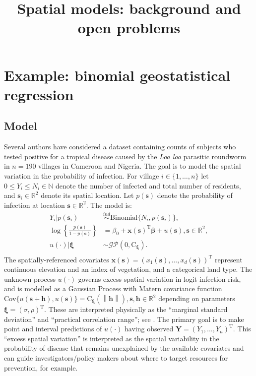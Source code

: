 \documentclass[12pt]{article}
\title{Spatial models: background and open problems}
\author{}
\date{}
\newcommand{\Nats}{\mathbb{N}}
\newcommand{\Reals}{\mathbb{R}}
\newcommand{\mb}[1]{\boldsymbol{#1}}
\newcommand{\Tr}{^{\textrm{T}}}
\newcommand{\norm}[1]{\left\lVert#1\right\rVert}
\begin{document}
\maketitle
\tableofcontents

\newpage

\section{Example: binomial geostatistical regression}

\subsection{Model}

Several authors \citep{loaloa,geostatsp,prevmap} have considered a dataset containing 
counts of subjects who tested positive for a tropical
disease caused by the \emph{Loa loa} parasitic roundworm in $n = 190$
villages in Cameroon and Nigeria. The goal is to model the spatial variation in
the probability of infection. For village $i\in\{1,\ldots,n\}$ let $0\leq Y_{i}\leq N_{i}\in\Nats$ denote the number 
of infected and total number of residents, and $\mb{s}_{i}\in\Reals^{2}$ denote its spatial location.
Let $p(\mb{s})$ denote the probability of infection at location $\mb{s}\in\Reals^{2}$. The model is:
\begin{equation}\begin{aligned}
Y_{i} | p(\mb{s}_{i}) &\overset{ind}{\sim}\text{Binomial}\{N_{i},p(\mb{s}_{i})\}, \\
\log\left\{\frac{p(\mb{s})}{1-p(\mb{s})}\right\} &= \beta_{0} + \mb{x}(\mb{s})\Tr\mb{\beta} + u(\boldsymbol{s}), \mb{s}\in\Reals^{2}, \\
u(\cdot) | \boldsymbol{\mb{\xi}} &\sim \mathcal{GP}(0,\text{C}_{\boldsymbol{\xi}}). \\
\end{aligned}\end{equation} 
The spatially-referenced covariates $\mb{x}(\mb{s}) = (x_1(\mb{s}),\ldots,x_d(\mb{s}))\Tr$ represent continuous elevation and an index of vegetation, and a categorical land type.
The unknown process \(u(\cdot)\)
governs excess spatial variation in logit infection risk, and is
modelled as a Gaussian Process with Matern
covariance function $\text{Cov}\{u(\mb{s}+\mb{h}),u(\mb{s})\} = \text{C}_{\boldsymbol{\xi}}(\norm{\mb{h}}), \mb{s},\mb{h}\in\Reals^{2}$
depending on parameters $\boldsymbol{\xi} = (\sigma,\rho)\Tr$. 
These are interpreted physically as the ``marginal standard deviation'' and ``practical correlation range''; see \citet{geostatsp}.
The primary goal is to make point and interval predictions of $u(\cdot)$ having observed $\mb{Y} = (Y_1,\ldots,Y_n)\Tr$.
This ``excess spatial variation'' is interpreted as the spatial variability in the probability of disease that remains unexplained by the available covariates and can guide investigators/policy makers about where to target resources for prevention, for example.
\end{document}
